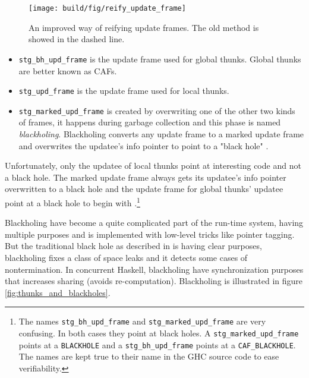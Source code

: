 \begin{figure}
\begin{mdframed}
  \texttt{[image: build/fig/reify\_update\_frame]}
  \caption{An improved way of reifying update frames. The old method is
  showed in the dashed line.}
  \label{fig:reify_update_frame}
\end{mdframed}
\end{figure}

\begin{itemize}
  \item
    \texttt{stg\_bh\_upd\_frame} is the update frame used for global
      thunks. Global thunks are better known as CAFs.
  \item
    \texttt{stg\_upd\_frame} is the update frame used for local
  thunks.
  \item
     \texttt{stg\_marked\_upd\_frame} is created
  by overwriting one of the other two kinds of frames, it
  happens during garbage collection and this phase is named
  \emph{blackholing}. Blackholing converts any update frame to a
  marked update frame \cite{github_overwrite_update_frame} and
  overwrites the updatee's info pointer to point to a "black hole"
  \cite{github_overwrite_blackhole}.
\end{itemize}

Unfortunately, only the updatee of local thunks point
at interesting code and not a black hole. The marked update frame
always gets its updatee's info pointer overwritten to a black
hole \cite{github_overwrite_blackhole} and the update frame
for global thunks' updatee point at a black hole to begin with
\cite{github_set_hdr_caf_blackhole}.\footnote{The names
  \texttt{stg\_bh\_upd\_frame} and \texttt{stg\_marked\_upd\_frame} are very
  confusing. In both cases they point at black holes. A
  \texttt{stg\_marked\_upd\_frame} points at a \texttt{BLACKHOLE} and a
  \texttt{stg\_bh\_upd\_frame} points at a \texttt{CAF\_BLACKHOLE}. The names
  are kept true to their name in the GHC source code to ease verifiability.}


Blackholing have become a quite complicated part of the run-time system,
having multiple purposes \cite{ghc_new_implementation_black_holes}
and is implemented with low-level tricks like pointer tagging. But the
traditional black hole as described in \cite{jones1992tail} is having
clear purposes, blackholing fixes a class of space leaks and it detects
some cases of nontermination. In concurrent Haskell, blackholing have
synchronization purposes that increases sharing (avoids re-computation). Blackholing
is illustrated in figure \ref{fig:thunks_and_blackholes}.

